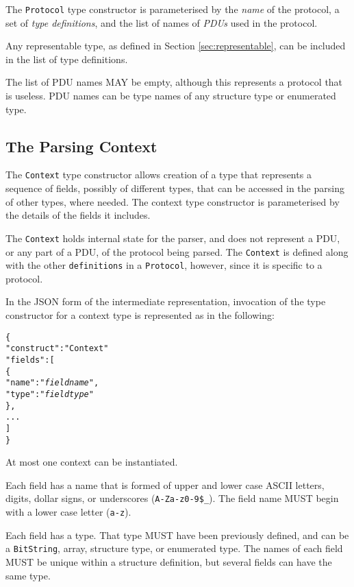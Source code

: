 \documentclass[10pt,twocolumn,a4paper]{article}
\newcommand{\code}[1]{\texttt{#1}}
\begin{document}
The \code{Protocol} type constructor is parameterised by the \emph{name} of the
protocol, a set of \emph{type definitions}, and the list of names of \emph{PDUs} used in
the protocol.

Any representable type, as defined in Section \ref{sec:representable}, can
be included in the list of type definitions.

The list of PDU names MAY be empty, although this represents a
protocol that is useless. PDU names can be type names of any structure type
or enumerated type. 

\subsection{The Parsing Context}
\label{sec:context}

The \code{Context} type constructor allows creation of a type that
represents a sequence of fields, possibly of different types, that can be
accessed in the parsing of other types, where needed. The context type
constructor is parameterised by the details of the fields it includes.

The \code{Context} holds internal state for the parser, and does not
represent a PDU, or any part of a PDU, of the protocol being parsed.
The \code{Context} is defined along with the other \code{definitions}
in a \code{Protocol}, however, since it is specific to a protocol.

In the JSON form of the intermediate representation, invocation of the type
constructor for a context type is represented as in the following:
\footnotesize
\begin{alltt}
  \{
    "construct"   : "Context"
    "fields"      : [
      \{
        "name"    : "\emph{field name}",
        "type"    : "\emph{field type}"
      \},
      ...
    ]
  \}
\end{alltt}
\normalsize
At most one context can be instantiated.

Each field has a name that is formed of upper and lower case ASCII letters,
digits, dollar signs, or underscores (\code{A-Za-z0-9\$\_}). The field name
MUST begin with a lower case letter (\code{a-z}).

Each field has a type. That type MUST have been previously defined, and can
be a \code{BitString}, array, structure type, or enumerated type. The names
of each field MUST be unique within a structure definition, but several
fields can have the same type.
\end{document}
